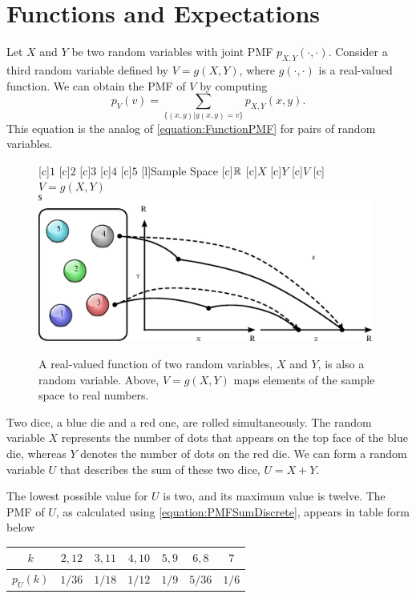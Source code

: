 \section{Functions and Expectations}

Let $X$ and $Y$ be two random variables with joint PMF $p_{X,Y} (\cdot, \cdot)$.
Consider a third random variable defined by $V = g(X,Y)$, where $g (\cdot, \cdot)$ is a real-valued function.
We can obtain the PMF of $V$ by computing
\begin{equation} \label{equation:PMFSumDiscrete}
p_V (v)
= \sum_{\{ (x,y) | g(x,y) = v \}} p_{X,Y} (x, y).
\end{equation}
This equation is the analog of \eqref{equation:FunctionPMF} for pairs of random variables.

\begin{figure}[ht]
\begin{center}
\begin{psfrags}
[c]{$1$}
[c]{$2$}
[c]{$3$}
[c]{$4$}
[c]{$5$}
[l]{Sample Space}
[c]{$\mathbb{R}$}
[c]{$X$}
[c]{$Y$}
[c]{$V$}
[c]{$V = g(X,Y)$}
\includegraphics[width=11cm]{Figures/7Chapter/vfcn}
\end{psfrags}
\caption{A real-valued function of two random variables, $X$ and $Y$, is also a random variable.
Above, $V = g(X, Y)$ maps elements of the sample space to real numbers.}
\end{center}
\end{figure}

\begin{example} \label{example:SumDice1}
Two dice, a blue die and a red one, are rolled simultaneously.
The random variable $X$ represents the number of dots that appears on the top face of the blue die, whereas $Y$ denotes the number of dots on the red die.
We can form a random variable $U$ that describes the sum of these two dice, $U = X + Y$.

The lowest possible value for $U$ is two, and its maximum value is twelve.
The PMF of $U$, as calculated using \eqref{equation:PMFSumDiscrete}, appears in table form below
\begin{center}
\begin{tabular}{|c|c|c|c|c|c|c|}
\hline
$k$ & $2, 12$ & $3, 11$ & $4, 10$ & $5, 9$ & $6, 8$ & $7$ \\
\hline
$p_U (k)$ & $1/36$ & $1/18$ & $1/12$ & $1/9$ & $5/36$ & $1/6$ \\
\hline
\end{tabular}
\end{center}
\end{example}

